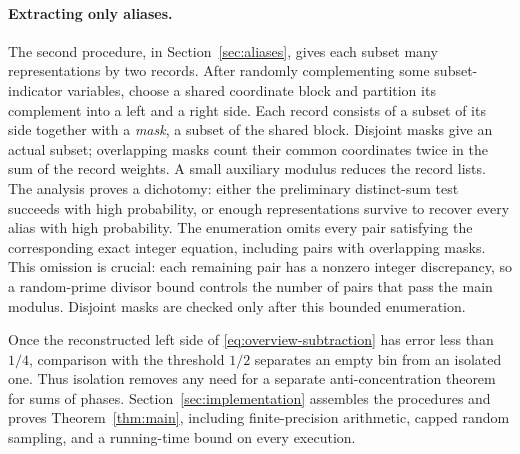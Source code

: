 \paragraph{Extracting only aliases.}
The second procedure, in Section~\ref{sec:aliases}, gives each subset
many representations by two records.  After randomly complementing
some subset-indicator variables, choose a shared coordinate block and
partition its complement into a left and a right side.  Each record
consists of a subset of its side together with a \emph{mask}, a subset
of the shared block.  Disjoint masks give an actual subset;
overlapping masks count their common coordinates twice in the sum of
the record weights.  A small auxiliary modulus reduces the record
lists.  The analysis proves a dichotomy: either the preliminary
distinct-sum test succeeds with high probability, or enough
representations survive to recover every alias with high probability.
The enumeration omits every pair satisfying the corresponding exact
integer equation, including pairs with overlapping masks.  This
omission is crucial: each remaining pair has a nonzero integer
discrepancy, so a random-prime divisor bound controls the number of
pairs that pass the main modulus.  Disjoint masks are checked only
after this bounded enumeration.

Once the reconstructed left side of \eqref{eq:overview-subtraction}
has error less than $1/4$, comparison with the threshold $1/2$
separates an empty bin from an isolated one.  Thus isolation removes any need for a separate
anti-concentration theorem for sums of phases.
Section~\ref{sec:implementation} assembles the procedures and proves
Theorem~\ref{thm:main}, including finite-precision arithmetic, capped
random sampling, and a running-time bound on every execution.
